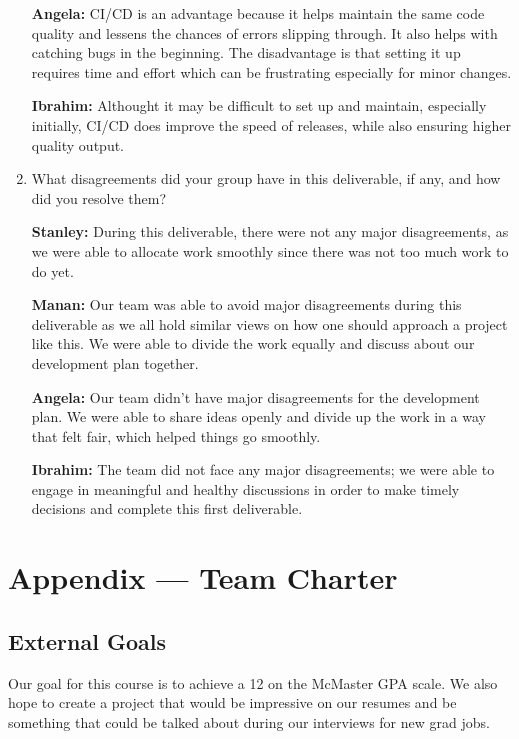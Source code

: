 \documentclass{article}
\begin{document}
\begin{enumerate}
\textbf{Angela:} CI/CD is an advantage because it helps maintain the same code quality and lessens the chances of errors slipping through. It also helps with catching bugs in the beginning. The disadvantage is that setting it up requires time and effort which can be frustrating especially for minor changes.

\textbf{Ibrahim:} Althought it may be difficult to set up and maintain, especially initially, CI/CD does improve the speed of releases, while also ensuring higher quality output.

    \item What disagreements did your group have in this deliverable, if any,
    and how did you resolve them?

\textbf{Stanley:} During this deliverable, there were not any major disagreements, as we were able to allocate work smoothly since there was not too much work to do yet.

\textbf{Manan:} Our team was able to avoid major disagreements during this deliverable as we all hold similar views on how one should approach a project like this. We were able to divide the work equally and discuss about our development plan together.

\textbf{Angela:} Our team didn’t have major disagreements for the development plan. We were able to share ideas openly and divide up the work in a way that felt fair, which helped things go smoothly. 

\textbf{Ibrahim:} The team did not face any major disagreements; we were able to engage in meaningful and healthy discussions in order to make timely decisions and complete this first deliverable.  

\end{enumerate}

\newpage{}

\section*{Appendix --- Team Charter}


\subsection*{External Goals}

Our goal for this course is to achieve a 12 on the McMaster GPA scale. We also hope to create a project that would be impressive on our resumes and be something that could be talked about during our interviews for new grad jobs. 
\end{document}

